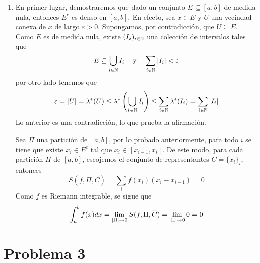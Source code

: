 \documentclass{article}
\begin{document}
\begin{enumerate}
    \item En primer lugar, demostraremos que dado un conjunto $E\subseteq[a,b]$ de medida nula, 
    entonces $E^{c}$ es denso en $[a,b]$. En efecto, sea $x\in E$ y $U$ una vecindad conexa de $x$ 
    de largo $\varepsilon>0$. Supongamos, por contradicción, que $U\subseteq E$. 
    Como $E$ es de medida nula, existe $(I_{i})_{i\in\mathbb{N}}$ una colección de intervalos tales que
    \begin{equation*}
        E\subseteq\bigcup_{i\in\mathbb{N}}I_{i}\hspace{4mm}\text{y}\hspace{4mm}
        \sum_{i\in\mathbb{N}}\left|I_{i} \right|<\varepsilon
    \end{equation*}
    por otro lado tenemos que
    \begin{equation*}
        \varepsilon=\left|U \right|=\lambda^{*}(U)\leq\lambda^{*}\left(\bigcup_{i\in\mathbb{N}}I_{i}\right)\leq
        \sum_{i\in\mathbb{N}}\lambda^{*}(I_{i})=\sum_{i\in\mathbb{N}}\left|I_{i} \right|
    \end{equation*}
    Lo anterior es una contradicción, lo que prueba la afirmación.
    \vspace{4mm}

    \noindent Sea $\Pi$ una partición de $[a,b]$, por lo probado anteriormente, para todo $i$ se
    tiene que existe $\overline{x_{i}}\in E^{c}$ tal que $\overline{x_{i}}\in[x_{i-1},x_{i}]$. De
    este modo, para cada partición $\Pi$ de $[a,b]$, escojemos el conjunto de representantes 
    $\overline{C}=\{\overline{x_{i}}\}_{i}$, entonces
    \begin{equation*}
        S(f,\Pi,\overline{C})=\sum_{i}f(\overline{x_{i}})(x_{i}-x_{i-1})=0
    \end{equation*}
    Como $f$ es Riemann integrable, se sigue que
    \begin{equation*}
        \int_{a}^{b}f(x)dx=\lim_{\left|\Pi \right|\to0}S(f,\Pi,\overline{C})=\lim_{\left|\Pi \right|\to0}0=0
    \end{equation*}
\end{enumerate}

\section*{Problema 3}
\end{document}
